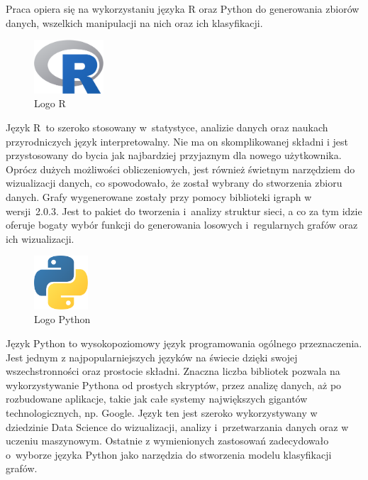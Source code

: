 Praca opiera się na wykorzystaniu języka R oraz Python do generowania zbiorów danych, wszelkich manipulacji na nich oraz ich klasyfikacji.

\begin{figure}[ht]
	\centering
	\includegraphics[height=2cm]{partials/images/logo_r.png}
	\caption{Logo R}
\label{Fig:R}
\end{figure}

Język R~to szeroko stosowany w~statystyce, analizie danych oraz naukach przyrodniczych język interpretowalny.
Nie ma on skomplikowanej składni i jest przystosowany do bycia jak najbardziej przyjaznym dla nowego użytkownika.
Oprócz dużych możliwości obliczeniowych, jest również świetnym narzędziem do wizualizacji danych,
co spowodowało, że został wybrany do stworzenia zbioru danych.
Grafy wygenerowane zostały przy pomocy biblioteki igraph w wersji~2.0.3.
Jest to pakiet do tworzenia i~analizy struktur sieci, a co za tym idzie oferuje bogaty wybór funkcji do
generowania losowych i~regularnych grafów oraz ich wizualizacji.

\begin{figure}[ht]
	\centering
	\includegraphics[height=2cm]{partials/images/logo_python.png}
	\caption{Logo Python}
\label{Fig:Python}
\end{figure}

Język Python to wysokopoziomowy język programowania ogólnego przeznaczenia. Jest
jednym z najpopularniejszych języków na świecie dzięki swojej wszechstronności oraz
prostocie składni. Znaczna liczba bibliotek pozwala na wykorzystywanie Pythona od
prostych skryptów, przez analizę danych, aż po rozbudowane aplikacje, takie jak całe
systemy największych gigantów technologicznych, np. Google. Język ten jest szeroko
wykorzystywany w dziedzinie Data Science do wizualizacji, analizy i~przetwarzania danych oraz w uczeniu maszynowym.
Ostatnie z wymienionych zastosowań zadecydowało o~wyborze języka Python jako narzędzia do stworzenia modelu klasyfikacji grafów.